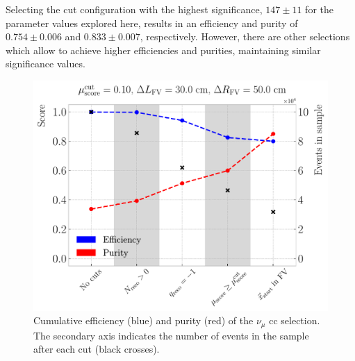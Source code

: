 Selecting the cut configuration with the highest significance, $147 \pm 11$ for the parameter values explored here, results in an efficiency and purity of $0.754 \pm 0.006$ and $0.833 \pm 0.007$, respectively. However, there are other selections which allow to achieve higher efficiencies and purities, maintaining similar significance values.

\begin{figure}[t]
	\centering
	\includegraphics[width=.90\linewidth]{Images/GAr_selection/numu_cc_selection_steps.pdf}
	\caption[Cumulative efficiency and purity for the $\nu_{\mu}$ \gls{cc} selection.]{Cumulative efficiency (blue) and purity (red) of the $\nu_{\mu}$ \gls{cc} selection. The secondary axis indicates the number of events in the sample after each cut (black crosses).}
	\label{fig:numuCC_selection_steps}
\end{figure}

